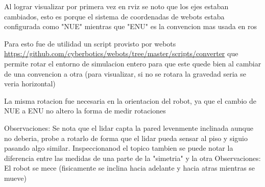 Al lograr visualizar por primera vez en rviz se noto que los ejes estaban cambiados, esto es porque el sistema de coordenadas de webots estaba configurada como "NUE" mientras que "ENU" es la convencion mas usada en ros

Para esto fue de utilidad un script provisto por webots \url{https://github.com/cyberbotics/webots/tree/master/scripts/converter} que permite rotar el entorno de simulacion entero para que este quede bien al cambiar de una convencion a otra (para visualizar, si no se rotara la gravedad seria se veria horizontal)

La misma rotacion fue necesaria en la orientacion del robot, ya que el cambio de NUE a ENU no altero la forma de medir rotaciones

Observaciones: Se nota que el lidar capta la pared levenmente inclinada aunque no deberia, probe a rotarlo de forma que el lidar pueda sensar al piso y siguio pasando algo similar. Inspeccionanod el topico tambien se puede notar la diferencia entre las medidas de una parte de la "simetria" y la otra
Observaciones: El robot se mece (fisicamente se inclina hacia adelante y hacia atras mientras se mueve)

